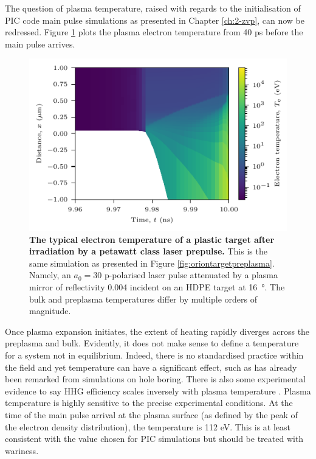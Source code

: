 The question of plasma temperature, raised with regards to the initialisation of PIC code main pulse simulations as presented in Chapter \ref{ch:2-zvp}, can now be redressed. Figure \ref{fig:oriontemperature} plots the plasma electron temperature from 40 ps before the main pulse arrives.
\begin{figure}
	\centering
	\includegraphics{figures/orion/orion_temperature}
	\caption[Typical electron temperature of a plastic target after irradiation by a petawatt class laser prepulse.]{\textbf{The typical electron temperature of a plastic target after irradiation by a petawatt class laser prepulse.} This is the same simulation as presented in Figure \ref{fig:oriontargetpreplasma}. Namely, an $a_0 = 30$ p-polarised laser pulse attenuated by a plasma mirror of reflectivity 0.004 incident on an HDPE target at \qty{16}{\degree}. The bulk and preplasma temperatures differ by multiple orders of magnitude.}
	\label{fig:oriontemperature}
\end{figure}
Once plasma expansion initiates, the extent of heating rapidly diverges across the preplasma and bulk. Evidently, it does not make sense to define a temperature for a system not in equilibrium. Indeed, there is no standardised practice within the field and yet temperature can have a significant effect, such as has already been remarked from simulations on hole boring. There is also some experimental evidence to say HHG efficiency scales inversely with plasma temperature \cite{kahalyDirectObservationDensityGradient2013}. Plasma temperature is highly sensitive to the precise experimental conditions. At the time of the main pulse arrival at the plasma surface (as defined by the peak of the electron density distribution), the temperature is 112 eV. This is at least consistent with the value chosen for PIC simulations but should be treated with wariness. 


